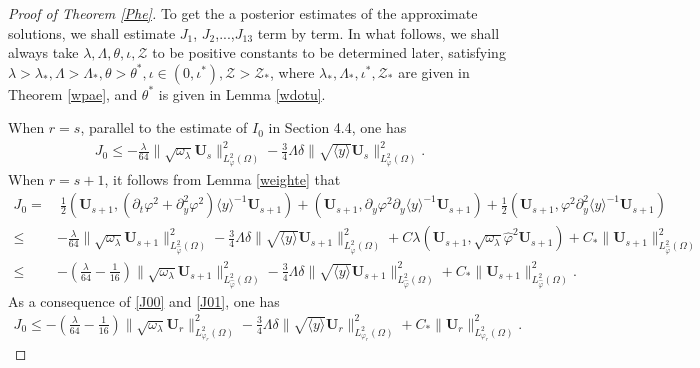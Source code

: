 \documentclass{amsart}
\numberwithin{equation}{section}
\newcommand\y{{{\langle y \rangle}}}
\begin{document}
\begin{proof}[Proof of Theorem \ref{Phe}]
To get the a posterior estimates of the approximate solutions, we shall estimate $J_{1}$, $J_{2}$,...,$J_{13}$ term by term.
In what follows, we shall always take $\lambda, \Lambda, \theta, \iota, \mathcal{Z}$ to be positive constants to be determined later, satisfying $\lambda>\lambda_{*}, \Lambda>\Lambda_{*}, \theta>\theta^{*}, \iota\in(0,\iota^{*}), \mathcal{Z}>\mathcal{Z}_{*}$, where $\lambda_{*}, \Lambda_{*},\iota^{*}, \mathcal{Z}_{*}$ are given in Theorem \ref{wpae}, and $\theta^{*}$ is given in Lemma \ref{wdotu}.

When $r=s$, parallel to the estimate of $I_{0}$ in Section 4.4, one has
\begin{align}\label{J00}
J_{0}\leq -\frac{\lambda}{64}\|\sqrt{\omega_{\lambda}}\mathbf{U}_{s}\|_{L_{\varphi}^{2}(\Omega)}^{2}
          -\frac{3}{4}\Lambda\delta\|\sqrt{\y}\mathbf{U}_{s}\|_{L_{\varphi}^{2}(\Omega)}^{2}.
\end{align}
When $r=s+1$, it follows from Lemma \ref{weighte} that
\begin{align}\label{J01}
J_{0}
=&~\frac{1}{2}(\mathbf{U}_{s+1},(\partial_{t}\varphi^{2}+\partial_{y}^{2}\varphi^{2})\y^{-1}\mathbf{U}_{s+1})
  +(\mathbf{U}_{s+1},\partial_{y}\varphi^{2}\partial_{y}\y^{-1}\mathbf{U}_{s+1})
  +\frac{1}{2}(\mathbf{U}_{s+1},\varphi^{2}\partial_{y}^{2}\y^{-1}\mathbf{U}_{s+1})\\
\leq&-\frac{\lambda}{64}\|\sqrt{\omega_{\lambda}}\mathbf{U}_{s+1}\|_{L_{\hat{\varphi}}^{2}(\Omega)}^{2}
     -\frac{3}{4}\Lambda\delta\|\sqrt{\y}\mathbf{U}_{s+1}\|_{L_{\hat{\varphi}}^{2}(\Omega)}^{2}
     +C\lambda(\mathbf{U}_{s+1},\sqrt{\omega_{\lambda}}\hat{\varphi}^{2}\mathbf{U}_{s+1})
     +C_{*}\|\mathbf{U}_{s+1}\|_{L_{\hat{\varphi}}^{2}(\Omega)}^{2}\nonumber\\
\leq&-\left(\frac{\lambda}{64}-\frac{1}{16}\right)\|\sqrt{\omega_{\lambda}}\mathbf{U}_{s+1}\|_{L_{\hat{\varphi}}^{2}(\Omega)}^{2}
     -\frac{3}{4}\Lambda\delta\|\sqrt{\y}\mathbf{U}_{s+1}\|_{L_{\hat{\varphi}}^{2}(\Omega)}^{2}
     +C_{*}\|\mathbf{U}_{s+1}\|_{L_{\hat{\varphi}}^{2}(\Omega)}^{2}.\nonumber
\end{align}
As a consequence of \eqref{J00} and \eqref{J01}, one has
\begin{align*}
J_{0}
\leq -\left(\frac{\lambda}{64}-\frac{1}{16}\right)\|\sqrt{\omega_{\lambda}}\mathbf{U}_{r}\|_{L_{\varphi_{r}}^{2}(\Omega)}^{2}
     -\frac{3}{4}\Lambda\delta\|\sqrt{\y}\mathbf{U}_{r}\|_{L_{\varphi_{r}}^{2}(\Omega)}^{2}
     +C_{*}\|\mathbf{U}_{r}\|_{L_{\varphi_{r}}^{2}(\Omega)}^{2}.
\end{align*}




\end{proof}
\end{document}
